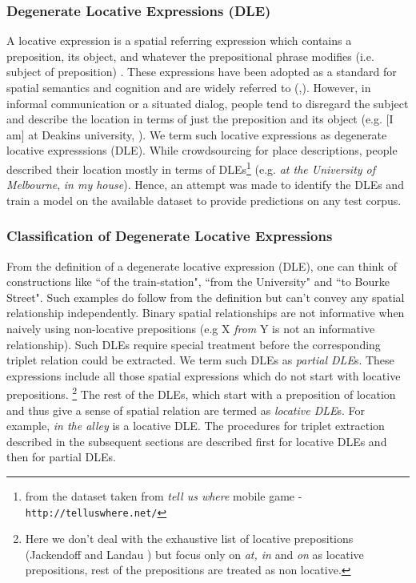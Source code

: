 \documentclass{acm_proc_article-sp}
\begin{document}
\subsubsection{Degenerate Locative Expressions (DLE)}
\label{DLE}
A locative expression is a spatial referring expression which contains a preposition, its object, and whatever the prepositional phrase modifies (i.e. subject of preposition) \cite{herskovits:pragmatics}. These expressions have been adopted as a standard for spatial semantics and cognition and are widely referred to (\cite{olivier:semantics},\cite{zlatev:semantics}). However, in informal communication or a situated dialog, people tend to disregard the subject and describe the location in terms of just the preposition and its object (e.g. [I am] at Deakins university, ). We term such locative expressions as degenerate locative expresssions (DLE). While crowdsourcing for place descriptions, people described their location mostly in terms of DLEs\footnote{from the dataset taken from \textit{tell us where} mobile game - \texttt{http://telluswhere.net/}} (e.g. \textit{at the University of Melbourne}, \textit{in my house}). Hence, an attempt was made to identify the DLEs and train a model on the available dataset to provide predictions on any test corpus.
\subsubsection*{Classification of Degenerate Locative Expressions}
From the definition of a degenerate locative expression (DLE), one can think of constructions like ``of the train-station", ``from the University" and ``to Bourke Street". Such examples do follow from the definition but can't convey any spatial relationship independently. Binary spatial relationships are not informative when naively using non-locative prepositions (e.g X \textit{from} Y is not an informative relationship). Such DLEs require special treatment before the corresponding triplet relation could be extracted. We term such DLEs as \textit{partial DLE}s. These expressions include all those spatial expressions which do not start with locative prepositions. \footnote{Here we don't deal with the exhaustive list of locative prepositions (Jackendoff and Landau \cite{landau:and}) but focus only on \textit{at, in} and \textit{on} as locative prepositions, rest of the prepositions are treated as non locative.}
The rest of the DLEs, which start with a preposition of location and thus give a sense of spatial relation are termed as \textit{locative DLE}s. For example, \textit{in the alley} is a locative DLE. The procedures for triplet extraction described in the subsequent sections are described first for locative DLEs and then for partial DLEs. 
\end{document}
